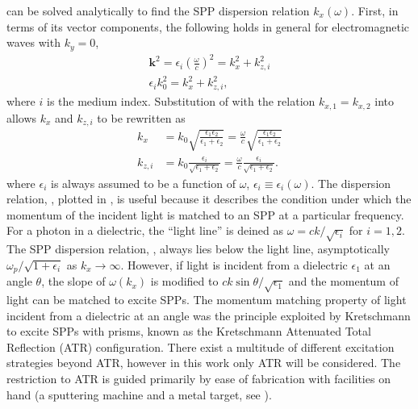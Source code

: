  can be solved analytically to find the SPP
dispersion relation $k_x(\omega)$.
First, in terms of its vector components, the following holds in general
for electromagnetic waves with $k_y=0$,
\begin{align}
\mathbf{k}^2=\epsilon_i {\left(\frac{\omega}{c}\right)}^2=k_x^2 + k_{z,i}^2\\
\epsilon_i k_0^2=k_x^2 + k_{z,i}^2,
\label{eqn:dispersion1}
\end{align}
where $i$ is the medium index.
Substitution of  with the relation 
$k_{x,1}=k_{x,2}$ into  allows 
$k_x$ and $k_{z,i}$ to be rewritten as
\begin{align}
k_x &= k_0\sqrt{\frac{\epsilon_1 \epsilon_2}{\epsilon_1+\epsilon_2}} 
= \frac{\omega}{c}\sqrt{\frac{\epsilon_1
\epsilon_2}{\epsilon_1+\epsilon_2}} \label{eqn:kayexx}\\
k_{z,i} &= k_0\frac{\epsilon_i}{\sqrt{\epsilon_1+\epsilon_2}}
= \frac{\omega}{c}\frac{\epsilon_i}{\sqrt{\epsilon_1+\epsilon_2}}.
\label{eqn:dandangus}
\end{align}
where $\epsilon_i$ is always assumed to be a function of $\omega$,
$\epsilon_i\equiv\epsilon_i(\omega)$.  The dispersion relation,
, plotted in , is
useful because it describes the condition under which the momentum of the
incident light is matched to an SPP at a particular frequency.  For a
photon in a dielectric, the ``light line'' is deined as $\omega = c k
/\sqrt{\epsilon_i}$ for $i=1,2$.  The SPP dispersion relation,
, always lies below the light line,
asymptotically $\omega_p/\sqrt{1+\epsilon_i}$ as $k_x\to\infty$.
However, if light is incident from a dielectric $\epsilon_1$ at an angle
$\theta$, the slope of $\omega(k_x)$ is modified to $c k \sin
\theta/\sqrt{\epsilon_1}$ and the momentum of light can be matched to
excite SPPs.  The momentum matching property of light incident from a
dielectric at an angle was the principle exploited by Kretschmann
\cite{kretschmann1968} to excite SPPs with prisms, known as the Kretschmann
Attenuated Total Reflection (ATR) configuration.  There exist a multitude of
different excitation strategies beyond ATR, however in this work only ATR
will be considered.  The restriction to ATR is guided primarily by ease of
fabrication with facilities on hand (a sputtering machine and a metal
target, see ).

